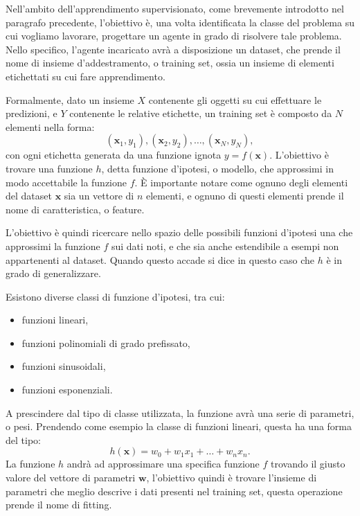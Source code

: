 \documentclass[../../main.tex]{subfiles}
\begin{document}
    Nell'ambito dell'apprendimento supervisionato, come brevemente introdotto nel paragrafo precedente, l'obiettivo è, una volta identificata la classe del problema su cui vogliamo lavorare, progettare un agente in grado di risolvere tale problema. Nello specifico, l'agente incaricato avrà a disposizione un dataset, che prende il nome di insieme d'addestramento, o training set, ossia un insieme di elementi etichettati su cui fare apprendimento.

    Formalmente, dato un insieme $X$ contenente gli oggetti su cui effettuare le predizioni, e $Y$ contenente le relative etichette, un training set è composto da $N$ elementi nella forma:
    \[(\boldsymbol{x}_1, y_1), (\boldsymbol{x}_2, y_2), \dots, (\boldsymbol{x}_N, y_N),\]
    con ogni etichetta generata da una funzione ignota $y = f(\boldsymbol{x})$. L'obiettivo è trovare una funzione $h$, detta funzione d'ipotesi, o modello, che approssimi in modo accettabile la funzione $f$. È importante notare come ognuno degli elementi del dataset $\boldsymbol{x}$ sia un vettore di $n$ elementi, e ognuno di questi elementi prende il nome di caratteristica, o feature.

    L'obiettivo è quindi ricercare nello spazio delle possibili funzioni d'ipotesi una che approssimi la funzione $f$ sui dati noti, e che sia anche estendibile a esempi non appartenenti al dataset. Quando questo accade si dice in questo caso che $h$ è in grado di generalizzare.

    Esistono diverse classi di funzione d'ipotesi, tra cui:
    \begin{itemize}
        \item funzioni lineari,
        \item funzioni polinomiali di grado prefissato,
        \item funzioni sinusoidali,
        \item funzioni esponenziali.
    \end{itemize}

    A prescindere dal tipo di classe utilizzata, la funzione avrà una serie di parametri, o pesi. Prendendo come esempio la classe di funzioni lineari, questa ha una forma del tipo:
    \[ h(\boldsymbol{x}) = w_0 + w_1x_1 + \dots + w_nx_n .\]
    La funzione $h$ andrà ad approssimare una specifica funzione $f$ trovando il giusto valore del vettore di parametri $\boldsymbol{w}$, l'obiettivo quindi è trovare l'insieme di parametri che meglio descrive i dati presenti nel training set, questa operazione prende il nome di fitting. 
\end{document}
